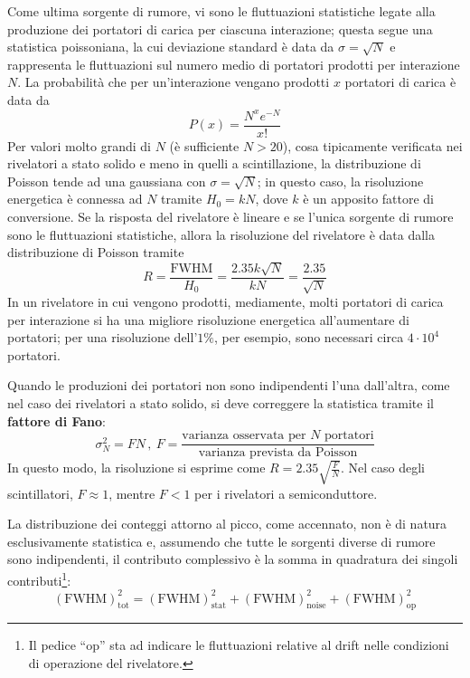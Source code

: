 \documentclass[11pt, a4paper]{scrartcl}
\theoremstyle{style}
\numberwithin{equation}{subsection}
\begin{document}
Come ultima sorgente di rumore, vi sono le fluttuazioni statistiche legate alla produzione dei portatori di carica per ciascuna interazione; questa segue una statistica poissoniana, la cui deviazione standard \`e data da $\sigma = \sqrt{N} $ e rappresenta le fluttuazioni sul numero medio di portatori prodotti per interazione $N$.
La probabilit\`a che per un'interazione vengano prodotti $x$ portatori di carica \`e data da 
\begin{equation}
	P(x) = \frac{N^xe^{-N}}{x!}
\end{equation}
Per valori molto grandi di $N$ (\`e sufficiente $N>20$), cosa tipicamente verificata nei rivelatori a stato solido e meno in quelli a scintillazione, la distribuzione di Poisson tende ad una gaussiana con $\sigma  = \sqrt{N} $; in questo caso, la risoluzione energetica \`e connessa ad $N$ tramite $H_0 = k N$, dove $k$ \`e un apposito fattore di conversione.
Se la risposta del rivelatore \`e lineare e se l'unica sorgente di rumore sono le fluttuazioni statistiche, allora la risoluzione del rivelatore \`e data dalla distribuzione di Poisson tramite 
\begin{equation}
	R = \frac{\text{FWHM}}{H_0} = \frac{2.35 k \sqrt{N} }{k N} = \frac{2.35}{\sqrt{N} }
\end{equation}
In un rivelatore in cui vengono prodotti, mediamente, molti portatori di carica per interazione si ha una migliore risoluzione energetica all'aumentare di portatori; per una risoluzione dell'$1\%$, per esempio, sono necessari circa $4 \cdot 10^{4}$ portatori.

Quando le produzioni dei portatori non sono indipendenti l'una dall'altra, come nel caso dei rivelatori a stato solido, si deve correggere la statistica tramite il \textbf{fattore di Fano}:
\begin{equation}
	\sigma _N^2 = FN \, , \ F = \frac{\text{varianza osservata per } N \text{ portatori}}{\text{varianza prevista da Poisson}}
\end{equation}
In questo modo, la risoluzione si esprime come $R = 2.35 \sqrt{\frac{F}{N}} $.
Nel caso degli scintillatori, $F\approx 1$, mentre $F<1$ per i rivelatori a semiconduttore.

La distribuzione dei conteggi attorno al picco, come accennato, non \`e di natura esclusivamente statistica e, assumendo che tutte le sorgenti diverse di rumore sono indipendenti, il contributo complessivo \`e la somma in quadratura dei singoli contributi\footnote{Il pedice ``op'' sta ad indicare le fluttuazioni relative al drift nelle condizioni di operazione del rivelatore.}:
\[
\left(\text{FWHM}\right) _\text{tot}^2 = \left(\text{FWHM}\right) _\text{stat}^2 + \left(\text{FWHM}\right) ^2 _\text{noise} + \left(\text{FWHM}\right) ^2 _\text{op}
\] 
\end{document}
